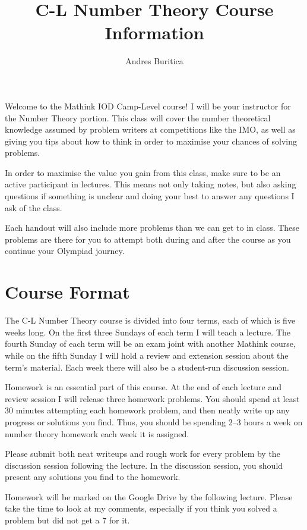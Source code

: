 \documentclass{article}
\title{C-L Number Theory Course Information}
\author{Andres Buritica}
\date{}
\begin{document}
\maketitle
Welcome to the Mathink IOD Camp-Level course! I will be your instructor for the
Number Theory portion. This class will cover the number theoretical knowledge
assumed by problem writers at competitions like the IMO, as well as giving you
tips about how to think in order to maximise your chances of solving problems.

In order to maximise the value you gain from this class, make sure to be an
active participant in lectures. This means not only taking notes, but also
asking questions if something is unclear and doing your best to answer any
questions I ask of the class.

Each handout will also include more problems than we can get to in class. These
problems are there for you to attempt both during and after the course as you
continue your Olympiad journey.
\section{Course Format}
The C-L Number Theory course is divided into four terms, each of which is five
weeks long. On the first three Sundays of each term I will teach a lecture. The
fourth Sunday of each term will be an exam joint with another Mathink course,
while on the fifth Sunday I will hold a review and extension session about the
term's material. Each week there will also be a student-run discussion session.

Homework is an essential part of this course. At the end of each lecture and
review session I will release three homework problems. You should spend at
least 30 minutes attempting each homework problem, and then neatly write up any
progress or solutions you find. Thus, you should be spending 2--3 hours a week
on number theory homework each week it is assigned.

Please submit both neat writeups and rough work
for every problem by the discussion session following the lecture. In the
discussion session, you should present any solutions you find to the homework.

Homework will be marked on the Google Drive by the following lecture. Please
take the time to look at my comments, especially if you think you solved a
problem but did not get a 7 for it.
\newpage
\end{document}
